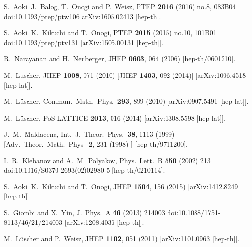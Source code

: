 \documentclass[preprint]{ptephy_v1}%
\begin{document}
\begin{thebibliography}{99}
  S.~Aoki, J.~Balog, T.~Onogi and P.~Weisz,
  PTEP {\bf 2016} (2016) no.8,  083B04
  doi:10.1093/ptep/ptw106
  arXiv:1605.02413 [hep-th].
  
  S.~Aoki, K.~Kikuchi and T.~Onogi,
  PTEP {\bf 2015} (2015) no.10,  101B01
  doi:10.1093/ptep/ptv131
  [arXiv:1505.00131 [hep-th]].
  
  R.~Narayanan and H.~Neuberger,
  JHEP {\bf 0603}, 064 (2006)
  [hep-th/0601210].
      
  M.~L\"uscher,
  JHEP {\bf 1008}, 071 (2010) [JHEP {\bf 1403}, 092 (2014)]
  [arXiv:1006.4518 [hep-lat]].

  M.~L\"uscher,
  Commun.\ Math.\ Phys.\  {\bf 293}, 899 (2010)
  [arXiv:0907.5491 [hep-lat]].

  M.~L\"uscher,
  PoS LATTICE {\bf 2013}, 016 (2014)
  [arXiv:1308.5598 [hep-lat]].

  J.~M.~Maldacena,
  Int.\ J.\ Theor.\ Phys.\  {\bf 38}, 1113  (1999) 
   [Adv.\ Theor.\ Math.\ Phys.\  {\bf 2}, 231 (1998) ]
  [hep-th/9711200].

  I.~R.~Klebanov and A.~M.~Polyakov,
  Phys.\ Lett.\ B {\bf 550} (2002) 213
  doi:10.1016/S0370-2693(02)02980-5
  [hep-th/0210114].
 
  S.~Aoki, K.~Kikuchi and T.~Onogi,
  JHEP {\bf 1504}, 156 (2015)
  [arXiv:1412.8249 [hep-th]].

  S.~Giombi and X.~Yin,
  J.\ Phys.\ A {\bf 46} (2013) 214003
  doi:10.1088/1751-8113/46/21/214003
  [arXiv:1208.4036 [hep-th]]. 


  M.~L\"uscher and P.~Weisz,
  JHEP {\bf 1102}, 051 (2011)  [arXiv:1101.0963 [hep-th]].


\end{thebibliography}
\end{document}
